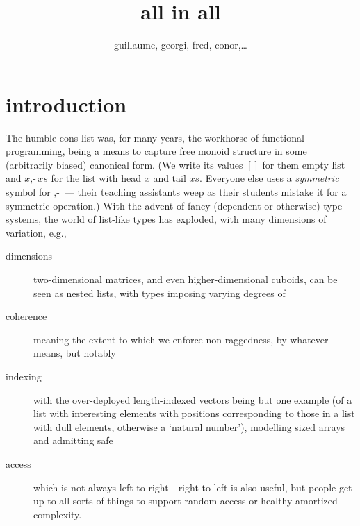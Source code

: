 \documentclass{article}
\begin{document}
\title{all in all}
\author{guillaume, georgi, fred, conor,\ldots}
\maketitle

\newcommand{\nil}{[]}
\newcommand{\cons}{\mbox{$,\!\textrm{-}$}}
\newcommand{\xs}{\mathit{xs}}
\newcommand{\ys}{\mathit{ys}}
\newcommand{\ps}{\mathit{ps}}
\newcommand{\qs}{\mathit{qs}}
\newcommand{\rs}{\mathit{rs}}
\renewcommand{\ss}{\mathit{ss}}
\newcommand{\ts}{\mathit{ts}}
\newcommand{\D}{\mathbf}
\newcommand{\Ty}{\mathbf{Ty}}
\newcommand{\Li}{\D{List}}
\newcommand{\All}{\D{All}}
\newcommand{\Alll}{\D{Alll}}
\newcommand{\ListR}{\D{ListR}}
\newcommand{\Matrix}{\D{Matrix}}
\newcommand{\IF}{\;\Leftarrow\;}
\newcommand{\hb}{\!:\!}
\newcommand{\ma}{\mathbf{map}}
\newcommand{\fst}{\mathbf{fst}}
\newcommand{\sel}{\downharpoonleft}
\newcommand{\emp}{\varepsilon}
\newcommand{\from}{\leftarrow}
\newcommand{\st}{\;|\;}
\newcommand{\g}{\:}
\newcommand{\s}{\:}

\section{introduction}

The humble cons-list was, for many years, the workhorse of functional programming, being a means to capture free monoid structure in some (arbitrarily biased) canonical form. (We write its values $\nil$ for them empty list and $x\cons\xs$ for the list with head $x$ and tail $\xs$. Everyone else uses a \emph{symmetric} symbol for $\cons$ --- their teaching assistants weep as their students mistake it for a symmetric operation.) With the advent of fancy (dependent or otherwise) type systems, the world of list-like types has exploded, with many dimensions of variation, e.g.,
\begin{description}
\item[dimensions] two-dimensional matrices, and even higher-dimensional cuboids, can be seen as nested lists, with types imposing varying degrees of
\item[coherence] meaning the extent to which we enforce non-raggedness, by whatever means, but notably
\item[indexing] with the over-deployed length-indexed vectors being but one example (of a list with interesting elements with positions corresponding to those in a list with dull elements, otherwise a `natural number'), modelling sized arrays and admitting safe
\item[access] which is not always left-to-right---right-to-left is also useful, but people get up to all sorts of things to support random access or healthy amortized complexity.
\end{description}
\end{document}
